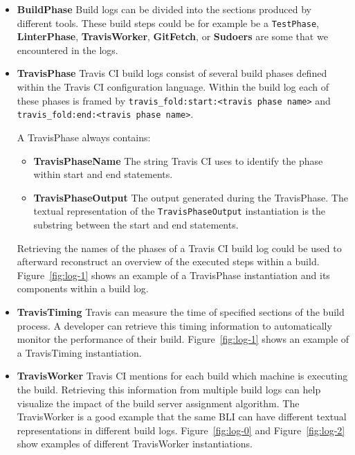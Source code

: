\documentclass[\myrootdir/main.tex]{subfiles}
\begin{document}
\begin{itemize}
	\item \textbf{BuildPhase} Build logs can be divided into the sections produced by different tools.
	      These build steps could be for example be a \texttt{TestPhase}, \textbf{LinterPhase}, \textbf{TravisWorker}, \textbf{GitFetch}, or \textbf{Sudoers} are some that we encountered in the logs.

	\item \textbf{TravisPhase} Travis CI build logs consist of several build phases defined within the Travis CI configuration language. Within the build log each of these phases is framed by \lstinline{travis_fold:start:<travis phase name>} and \\ \lstinline{travis_fold:end:<travis phase name>}.

	      A TravisPhase always contains:
	      \begin{itemize}
		      \item \textbf{TravisPhaseName} The string Travis CI uses to identify the phase within start and end statements.
		      \item \textbf{TravisPhaseOutput} The output generated during the TravisPhase. The textual representation of the \texttt{TravisPhaseOutput} instantiation is the substring between the start and end statements.
	      \end{itemize}
				 Retrieving the names of the phases of a Travis CI build log could be used to afterward reconstruct an overview of the executed steps within a build.
	       Figure~\ref{fig:log-1} shows an example of a TravisPhase instantiation and its components within a build log.

	\item \textbf{TravisTiming} Travis can measure the time of specified sections of the build process.
				A developer can retrieve this timing information to automatically monitor the performance of their build.
	      Figure~\ref{fig:log-1} shows an example of a TravisTiming instantiation.

	\item \textbf{TravisWorker} Travis CI mentions for each build which machine is executing the build.
	      Retrieving this information from multiple build logs can help visualize the impact of the build server assignment algorithm.
	      The TravisWorker is a good example that the same BLI can have different textual representations in different build logs.
	      Figure~\ref{fig:log-0} and Figure~\ref{fig:log-2} show examples of different TravisWorker instantiations.


\end{itemize}
\end{document}
